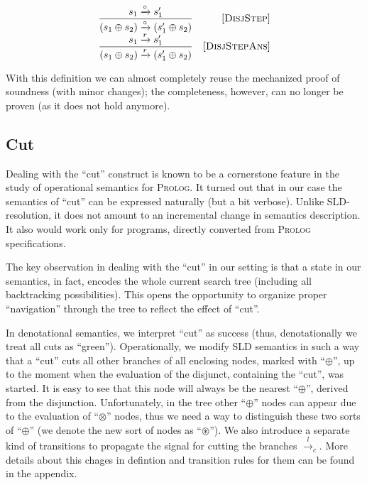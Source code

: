\[
  \begin{array}{cr}
    \dfrac{s_1 \xrightarrow{\circ} s'_1}{(s_1 \oplus s_2) \xrightarrow{\circ} (s'_1 \oplus s_2)} &\mbox{[\textsc{DisjStep}]}\\
    \dfrac{s_1 \xrightarrow{r} s'_1}{(s_1 \oplus s_2) \xrightarrow{r} (s'_1 \oplus s_2)} &\mbox{[\textsc{DisjStepAns}]}
  \end{array}
\]

With this definition we can almost completely reuse the mechanized proof of soundness (with minor changes); the completeness, however,
can no longer be proven (as it does not hold anymore).

\subsection{Cut}
\label{cut}

Dealing with the ``cut'' construct is known to be a cornerstone feature in the study of operational semantics for \textsc{Prolog}. It turned out that
in our case the semantics of ``cut'' can be expressed naturally (but a bit verbose). Unlike SLD-resolution, it does not amount to an incremental
change in semantics description. It also would work only for programs, directly converted from \textsc{Prolog} specifications.

The key observation in dealing with the ``cut'' in our setting is that a state in our semantics, in fact, encodes the whole current
search tree (including all backtracking possibilities). This opens the opportunity to organize proper ``navigation'' through the tree
to reflect the effect of ``cut''.

In denotational semantics, we interpret ``cut'' as success (thus, denotationally we treat all cuts as ``green''). Operationally, we
modify SLD semantics in such a way that a ``cut'' cuts all other branches of all enclosing nodes, marked with ``$\oplus$'', up to
the moment when the evaluation of the disjunct, containing the ``cut'', was started. It is easy to see that this node will always
be the nearest ``$\oplus$'', derived from the disjunction. Unfortunately, in the tree other ``$\oplus$'' nodes can
appear due to the evaluation of ``$\otimes$'' nodes, thus we need a way to distinguish these two sorts of ``$\oplus$'' (we
denote the new sort of nodes as ``$\circledast$''). We also introduce a separate kind of transitions to propagate the signal for cutting the branches $\xrightarrow{l}_c$.
More details about this chages in defintion and transition rules for them can be found in the appendix.


